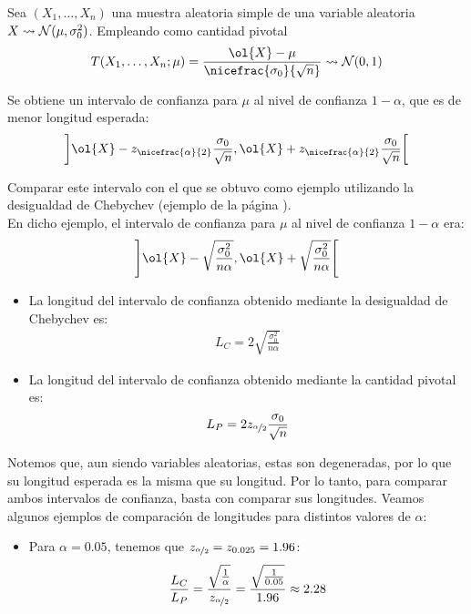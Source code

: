 \begin{ejemplo}
    Sea $(X_1, \ldots, X_n)$ una muestra aleatoria simple de una variable aleatoria $X\rightsquigarrow \mathcal{N}(\mu, \sigma^2_0)$. Empleando como cantidad pivotal
    \begin{align*}
        T(X_1, \ldots, X_n; \mu) = \frac{\ol{X} - \mu}{\nicefrac{\sigma_0}{\sqrt{n}}} \rightsquigarrow \cc{N}(0, 1)
    \end{align*}

    Se obtiene un intervalo de confianza para $\mu$ al nivel de confianza $1 - \alpha$, que es de menor longitud esperada:
    \begin{align*}
        \left]\ol{X} - z_{\nicefrac{\alpha}{2}} \dfrac{\sigma_0}{\sqrt{n}}, \ol{X} + z_{\nicefrac{\alpha}{2}} \dfrac{\sigma_0}{\sqrt{n}}\right[
    \end{align*}

    Comparar este intervalo con el que se obtuvo como ejemplo utilizando la desigualdad de Chebychev (ejemplo de la página \pageref{ejemplo:chebychev}).\\

    En dicho ejemplo, el intervalo de confianza para $\mu$ al nivel de confianza $1 - \alpha$ era:
    \begin{align*}
        \left]\ol{X} - \sqrt{\frac{\sigma^2_0}{n \alpha}}, \ol{X} + \sqrt{\frac{\sigma^2_0}{n \alpha}}\right[
    \end{align*}

    \begin{itemize}
        \item La longitud del intervalo de confianza obtenido mediante la desigualdad de Chebychev es:
        \begin{align*}
            L_C = 2\sqrt{\frac{\sigma^2_0}{n \alpha}}
        \end{align*}

        \item La longitud del intervalo de confianza obtenido mediante la cantidad pivotal es:
        \begin{align*}
            L_P = 2 z_{\nicefrac{\alpha}{2}} \dfrac{\sigma_0}{\sqrt{n}}
        \end{align*}
    \end{itemize}

    Notemos que, aun siendo variables aleatorias, estas son degeneradas, por lo que su longitud esperada es la misma que su longitud. Por lo tanto, para comparar ambos intervalos de confianza, basta con comparar sus longitudes. Veamos algunos ejemplos de comparación de longitudes para distintos valores de $\alpha$:
    \begin{itemize}
        \item Para $\alpha = 0.05$, tenemos que $z_{\nicefrac{\alpha}{2}} = z_{0.025} = 1.96$:
        \begin{align*}
            \dfrac{L_C}{L_P} = \dfrac{\sqrt{\frac{1}{\alpha}}}{z_{\nicefrac{\alpha}{2}}} = \dfrac{\sqrt{\frac{1}{0.05}}}{1.96} \approx 2.28
        \end{align*}


\end{itemize}
\end{ejemplo}
